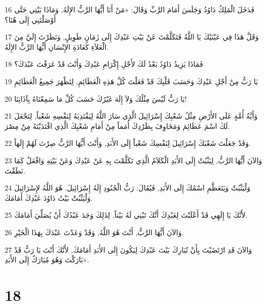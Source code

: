 \par 16 فَدَخَلَ الْمَلِكُ دَاوُدُ وَجَلَسَ أَمَامَ الرَّبِّ وَقَالَ: «مَنْ أَنَا أَيُّهَا الرَّبُّ الإِلَهُ, وَمَاذَا بَيْتِي حَتَّى أَوْصَلْتَنِي إِلَى هُنَا؟
\par 17 وَقَلَّ هَذَا فِي عَيْنَيْكَ يَا اللَّهُ فَتَكَلَّمْتَ عَنْ بَيْتِ عَبْدِكَ إِلَى زَمَانٍ طَوِيلٍ, وَنَظَرْتَ إِلَيَّ مِنَ الْعَلاَءِ كَعَادَةِ الإِنْسَانِ أَيُّهَا الرَّبُّ الإِلَهُ.
\par 18 فَمَاذَا يَزِيدُ دَاوُدُ بَعْدُ لَكَ لأَجْلِ إِكْرَامِ عَبْدِكَ وَأَنْتَ قَدْ عَرَفْتَ عَبْدَكَ؟
\par 19 يَا رَبُّ مِنْ أَجْلِ عَبْدِكَ وَحَسَبَ قَلْبِكَ قَدْ فَعَلْتَ كُلَّ هَذِهِ الْعَظَائِمِ, لِتَظْهَرَ جَمِيعُ الْعَظَائِمِ
\par 20 يَا رَبُّ لَيْسَ مِثْلُكَ وَلاَ إِلَهَ غَيْرُكَ حَسَبَ كُلِّ مَا سَمِعْنَاهُ بِآذَانِنَا!
\par 21 وَأَيَّةُ أُمَّةٍ عَلَى الأَرْضِ مِثْلُ شَعْبِكَ إِسْرَائِيلَ الَّذِي سَارَ اللَّهُ لِيَفْتَدِيَهُ لِنَفْسِهِ شَعْباً, لِتَجْعَلَ لَكَ اسْمَ عَظَائِمَ وَمَخَاوِفَ بِطَرْدِكَ أُمَماً مِنْ أَمَامِ شَعْبِكَ الَّذِي افْتَدَيْتَهُ مِنْ مِصْرَ.
\par 22 وَقَدْ جَعَلْتَ شَعْبَكَ إِسْرَائِيلَ لِنَفْسِكَ شَعْباً إِلَى الأَبَدِ, وَأَنْتَ أَيُّهَا الرَّبُّ صِرْتَ لَهُمْ إِلَهاً.
\par 23 وَالآنَ أَيُّهَا الرَّبُّ, لِيَثْبُتْ إِلَى الأَبَدِ الْكَلاَمُ الَّذِي تَكَلَّمْتَ بِهِ عَنْ عَبْدِكَ وَعَنْ بَيْتِهِ وَافْعَلْ كَمَا نَطَقْتَ.
\par 24 وَلْيَثْبُتْ وَيَتَعَظَّمِ اسْمُكَ إِلَى الأَبَدِ, فَيُقَالَ: رَبُّ الْجُنُودِ إِلَهُ إِسْرَائِيلَ. هُوَ اللَّهُ لإِسْرَائِيلَ وَلْيَثْبُتْ بَيْتُ دَاوُدَ عَبْدِكَ أَمَامَكَ.
\par 25 لأَنَّكَ يَا إِلَهِي قَدْ أَعْلَنْتَ لِعَبْدِكَ أَنَّكَ تَبْنِي لَهُ بَيْتاً, لِذَلِكَ وَجَدَ عَبْدُكَ أَنْ يُصَلِّيَ أَمَامَكَ.
\par 26 وَالآنَ أَيُّهَا الرَّبُّ, أَنْتَ هُوَ اللَّهُ, وَقَدْ وَعَدْتَ عَبْدَكَ بِهَذَا الْخَيْرِ.
\par 27 وَالآنَ قَدِ ارْتَضَيْتَ بِأَنْ تُبَارِكَ بَيْتَ عَبْدِكَ لِيَكُونَ إِلَى الأَبَدِ أَمَامَكَ, لأَنَّكَ أَنْتَ يَا رَبُّ قَدْ بَارَكْتَ وَهُوَ مُبَارَكٌ إِلَى الأَبَدِ».

\chapter{18}

